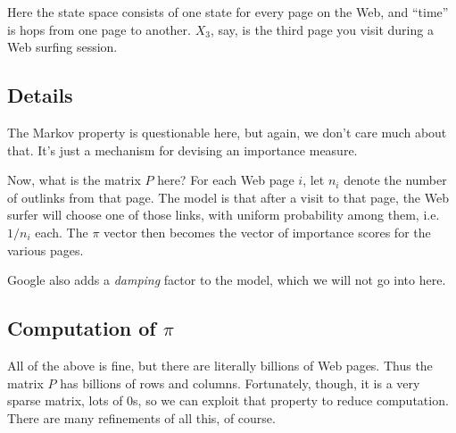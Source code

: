 Here the state space consists of one state for every page on the Web,
and ``time'' is hops from one page to another.  $X_3$, say, is the third
page you visit during a Web surfing session.

\subsection{Details}

The Markov property is questionable here, but again, we don't care much
about that.  It's just a mechanism for devising an importance measure.

Now, what is the matrix $P$ here?  For each Web page $i$, let $n_i$
denote the number of outlinks from that page.  The model is that after a
visit to that page, the Web surfer will choose one of those links, with
uniform probability among them, i.e.\ $1/n_i$ each.  The $\pi$ vector
then becomes the vector of importance scores for the various pages.

Google also adds a \textit{damping} factor to the model, which we will
not go into here.

\subsection{Computation of $\pi$}

All of the above is fine, but there are literally billions of Web pages.
Thus the matrix $P$ has billions of rows and columns.  Fortunately,
though, it is a very sparse matrix, lots of 0s, so we can exploit that
property to reduce computation.  There are many refinements of all this,
of course.

